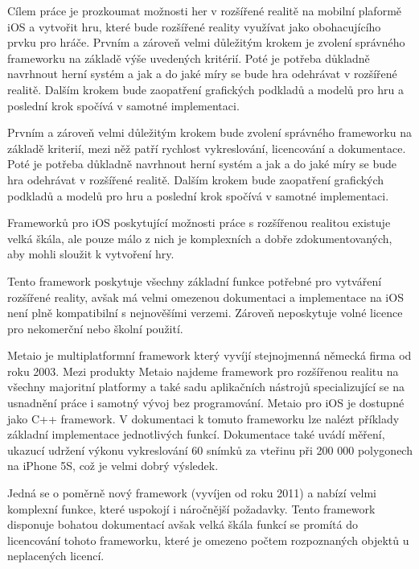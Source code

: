 \documentclass[oneside,12pt]{article}
\begin{document}
Cílem práce je prozkoumat možnosti her v rozšířené realitě na mobilní plaformě iOS a vytvořit hru, které bude rozšířené reality využívat jako obohacujícího prvku pro hráče. Prvním a zároveň velmi důležitým krokem je zvolení správného frameworku na základě výše uvedených kritérií. Poté je potřeba důkladně navrhnout herní systém a jak a do jaké míry se bude hra odehrávat v rozšířené realitě. Dalším krokem bude zaopatření grafických podkladů a modelů pro hru a poslední krok spočívá v samotné implementaci.

Prvním a zároveň velmi důležitým krokem bude zvolení správného frameworku na základě kriterií, mezi něž patří rychlost vykreslování, licencování a dokumentace. Poté je potřeba důkladně navrhnout herní systém a jak a do jaké míry se bude hra odehrávat v rozšířené realitě. Dalším krokem bude zaopatření grafických podkladů a modelů pro hru a poslední krok spočívá v samotné implementaci.


Frameworků pro iOS poskytující možnosti práce s rozšířenou realitou existuje velká škála, ale pouze málo z nich je komplexních a dobře zdokumentovaných, aby mohli sloužit k vytvoření hry.

Tento framework poskytuje všechny základní funkce potřebné pro vytváření rozšířené reality, avšak má velmi omezenou dokumentaci a implementace na iOS není plně kompatibilní s nejnověšími verzemi. Zároveň neposkytuje volné licence pro nekomerční nebo školní použití.

Metaio je multiplatformní framework který vyvíjí stejnojmenná německá firma od roku 2003. Mezi produkty Metaio najdeme framework pro rozšířenou realitu na všechny majoritní platformy a také sadu aplikačních nástrojů specializující se na usnadnění práce i samotný vývoj bez programování. Metaio pro iOS je dostupné jako C++ framework. V dokumentaci k tomuto frameworku lze nalézt příklady základní implementace jednotlivých funkcí. Dokumentace také uvádí měření, ukazucí udržení výkonu vykreslování 60 snímků za vteřinu při 200 000 polygonech na iPhone 5S, což je velmi dobrý výsledek.

Jedná se o poměrně nový framework (vyvíjen od roku 2011) a nabízí velmi komplexní funkce, které uspokojí i náročnější požadavky. Tento framework disponuje bohatou dokumentací avšak velká škála funkcí se promítá do licencování tohoto frameworku, které je omezeno počtem rozpoznaných objektů u neplacených licencí.
\end{document}
